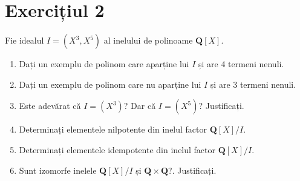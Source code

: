 \documentclass{article}
\begin{document}
\begin{itemize}
\end{itemize}

\section{Exercițiul 2}
Fie idealul $I = (X^3, X^5)$ al inelului de polinoame $\mathbf{Q}[X]$.
\begin{enumerate}
    \item Dați un exemplu de polinom care aparține lui $I$ și are 4 termeni nenuli.
    \item Dați un exemplu de polinom care nu aparține lui $I$ și are 3 termeni nenuli.
    \item Este adevărat că $I=(X^3)$? Dar că $I=(X^5)$? Justificați.
    \item Determinați elementele nilpotente din inelul factor $\mathbf{Q}[X]/I$.
    \item Determinați elementele idempotente din inelul factor $\mathbf{Q}[X]/I$.
    \item Sunt izomorfe inelele $\mathbf{Q}[X]/I$ și $\mathbf{Q} \times \mathbf{Q}$?. Justificați.
\end{enumerate}  
\end{document}
